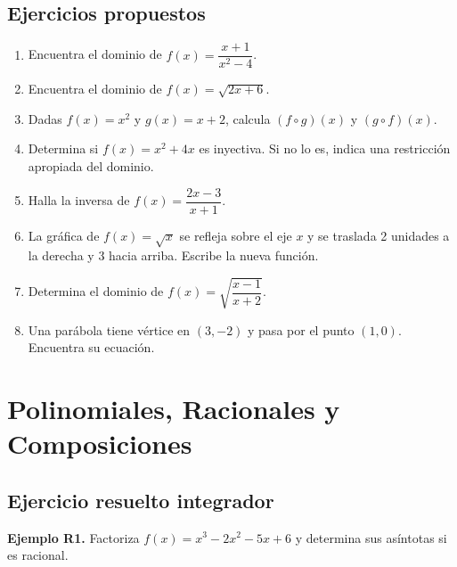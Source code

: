 \documentclass[12pt, a4paper]{article}
\begin{document}
\subsection{Ejercicios propuestos}

\begin{enumerate}[leftmargin=*, resume]
  \item \facil{} Encuentra el dominio de $f(x) = \dfrac{x + 1}{x^2 - 4}$.

  \item \facil{} Encuentra el dominio de $f(x) = \sqrt{2x + 6}$.

  \item \facil{} Dadas $f(x) = x^2$ y $g(x) = x + 2$, calcula $(f \circ g)(x)$ y $(g \circ f)(x)$.

  \item \medio{} Determina si $f(x) = x^2 + 4x$ es inyectiva. Si no lo es, indica una restricción apropiada del dominio.

  \item \medio{} Halla la inversa de $f(x) = \dfrac{2x - 3}{x + 1}$.

  \item \medio{} La gráfica de $f(x) = \sqrt{x}$ se refleja sobre el eje $x$ y se traslada 2 unidades a la derecha y 3 hacia arriba. Escribe la nueva función.

  \item \dificil{} Determina el dominio de $f(x) = \sqrt{\dfrac{x - 1}{x + 2}}$.

  \item \dificil{} Una parábola tiene vértice en $(3, -2)$ y pasa por el punto $(1, 0)$. Encuentra su ecuación.
\end{enumerate}

\newpage

\section{Polinomiales, Racionales y Composiciones}

\subsection{Ejercicio resuelto integrador}

\textbf{Ejemplo R1.} Factoriza $f(x) = x^3 - 2x^2 - 5x + 6$ y determina sus asíntotas si es racional.
\end{document}
